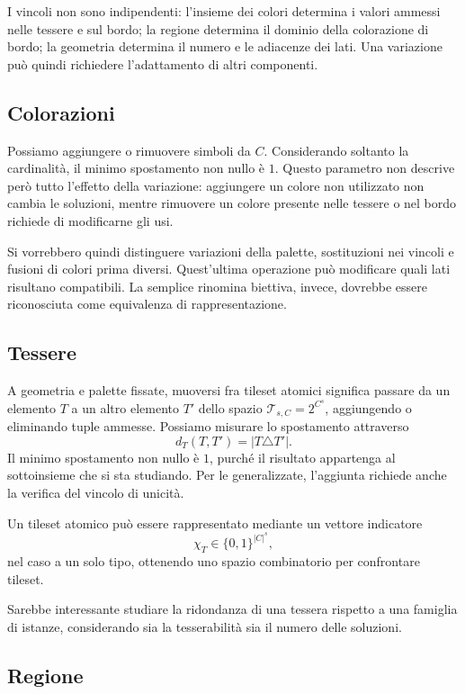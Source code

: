 \documentclass[11pt,a4paper]{article}
\begin{document}
I vincoli non sono indipendenti: l'insieme dei colori determina i valori ammessi nelle tessere e sul bordo; la regione determina il dominio della colorazione di bordo; la geometria determina il numero e le adiacenze dei lati. Una variazione può quindi richiedere l'adattamento di altri componenti. 

\subsection{Colorazioni}

Possiamo aggiungere o rimuovere simboli da $C$. Considerando soltanto la cardinalità, il minimo spostamento non nullo è $1$. Questo parametro non descrive però tutto l'effetto della variazione: aggiungere un colore non utilizzato non cambia le soluzioni, mentre rimuovere un colore presente nelle tessere o nel bordo richiede di modificarne gli usi.

Si vorrebbero quindi distinguere variazioni della palette, sostituzioni nei vincoli e fusioni di colori prima diversi. Quest'ultima operazione può modificare quali lati risultano compatibili. La semplice rinomina biettiva, invece, dovrebbe essere riconosciuta come equivalenza di rappresentazione.

\subsection{Tessere}

A geometria e palette fissate, muoversi fra tileset atomici significa passare da un elemento $T$ a un altro elemento $T'$ dello spazio $\mathcal T_{s,C}=2^{C^s}$, aggiungendo o eliminando tuple ammesse. Possiamo misurare lo spostamento attraverso
\[
d_T(T,T')=|T\triangle T'|.
\]
Il minimo spostamento non nullo è $1$, purché il risultato appartenga al sottoinsieme che si sta studiando. Per le generalizzate, l'aggiunta richiede anche la verifica del vincolo di unicità.

Un tileset atomico può essere rappresentato mediante un vettore indicatore
\[
\chi_T\in\{0,1\}^{|C|^s},
\]
nel caso a un solo tipo, ottenendo uno spazio combinatorio per confrontare tileset.

Sarebbe interessante studiare la ridondanza di una tessera rispetto a una famiglia di istanze, considerando sia la tesserabilità sia il numero delle soluzioni.

\subsection{Regione}
\end{document}
